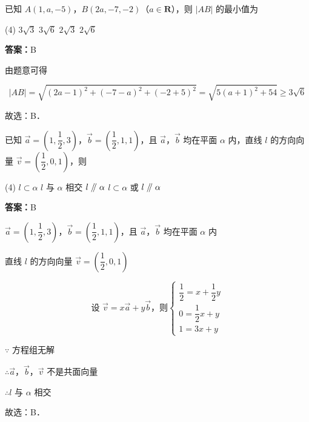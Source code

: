 \vspace{2em}

\begin{example}[\bkstar{2}{5}]
已知 $A(1,a,-5)$，$B(2a,-7,-2)$（$a\in\mathbf{R}$），则 $|AB|$ 的最小值为
\begin{tasks}(4)
    \task $3\sqrt{3}$
    \task $3\sqrt{6}$
    \task $2\sqrt{3}$
    \task $2\sqrt{6}$
\end{tasks}
\end{example}
\begin{solution}
\textbf{答案：}B

由题意可得

$$
|AB|=\sqrt{(2a-1)^2+(-7-a)^2+(-2+5)^2}=\sqrt{5(a+1)^2+54}\geq 3\sqrt{6}
$$

故选：B．
\end{solution}

\vspace{2em}


\begin{example}[\bkstar{3}{5}]
已知 $\overrightarrow{a}=\left(1,\dfrac{1}{2},3\right)$，$\overrightarrow{b}=\left(\dfrac{1}{2},1,1\right)$，且 $\overrightarrow{a}$，$\overrightarrow{b}$ 均在平面 $\alpha$ 内，直线 $l$ 的方向向量 $\overrightarrow{v}=\left(\dfrac{1}{2},0,1\right)$，则
\begin{tasks}(4)
    \task $l\subset\alpha$
    \task $l$ 与 $\alpha$ 相交
    \task $l\mathrel{/\mkern-5mu/}\alpha$
    \task $l\subset\alpha$ 或 $l\mathrel{/\mkern-5mu/}\alpha$
\end{tasks}
\end{example}
\begin{solution}
\textbf{答案：}B

$\overrightarrow{a}=\left(1,\dfrac{1}{2},3\right)$，$\overrightarrow{b}=\left(\dfrac{1}{2},1,1\right)$，且 $\overrightarrow{a}$，$\overrightarrow{b}$ 均在平面 $\alpha$ 内

直线 $l$ 的方向向量 $\overrightarrow{v}=\left(\dfrac{1}{2},0,1\right)$

$$
\text{设 }\overrightarrow{v}=x\overrightarrow{a}+y\overrightarrow{b}\text{，则}\left\{\begin{array}{l}
\dfrac{1}{2}=x+\dfrac{1}{2}y\\
0=\dfrac{1}{2}x+y\\
1=3x+y
\end{array}\right.
$$

$\because$ 方程组无解

$\therefore \overrightarrow{a}$，$\overrightarrow{b}$，$\overrightarrow{v}$ 不是共面向量

$\therefore l$ 与 $\alpha$ 相交

故选：B．
\end{solution}

